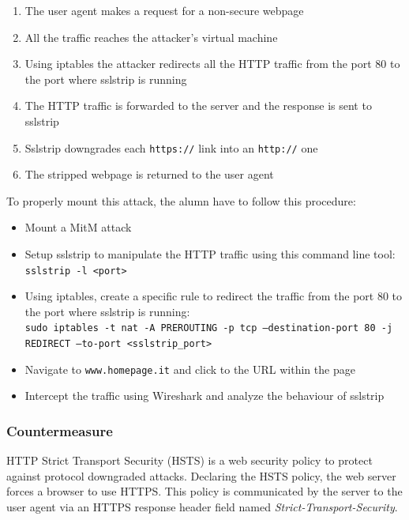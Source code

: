 \documentclass[final]{article}
\begin{document}
\begin{enumerate}
  \item The user agent makes a request for a non-secure webpage
  \item All the traffic reaches the attacker's virtual machine
  \item Using iptables the attacker redirects all the HTTP traffic from the port 80 to the port where sslstrip is running
  \item The HTTP traffic is forwarded to the server and the response is sent to sslstrip
  \item Sslstrip downgrades each \texttt{https://} link into an \texttt{http://} one
  \item The stripped webpage is returned to the user agent
\end{enumerate}

\noindent To properly mount this attack, the alumn have to follow this procedure:
\begin{itemize}
  \item Mount a \ac{MitM} attack
  \item Setup sslstrip to manipulate the HTTP traffic using this command line tool: \texttt{sslstrip -l <port>}
  \item Using iptables, create a specific rule to redirect the traffic from the port 80 to the port where sslstrip is running:\\
  \texttt{sudo iptables -t nat -A PREROUTING -p tcp --destination-port 80 -j REDIRECT --to-port <sslstrip\_port>}
  \item Navigate to \texttt{www.homepage.it} and click to the URL within the page
  \item Intercept the traffic using Wireshark and analyze the behaviour of sslstrip
\end{itemize}

\subsubsection{Countermeasure}
HTTP Strict Transport Security (HSTS) is a web security policy to protect against protocol downgraded attacks.
Declaring the HSTS policy, the web server forces a browser to use HTTPS.
This policy is communicated by the server to the user agent via an HTTPS response header field named \textit{Strict-Transport-Security}.
\newpage
\end{document}

